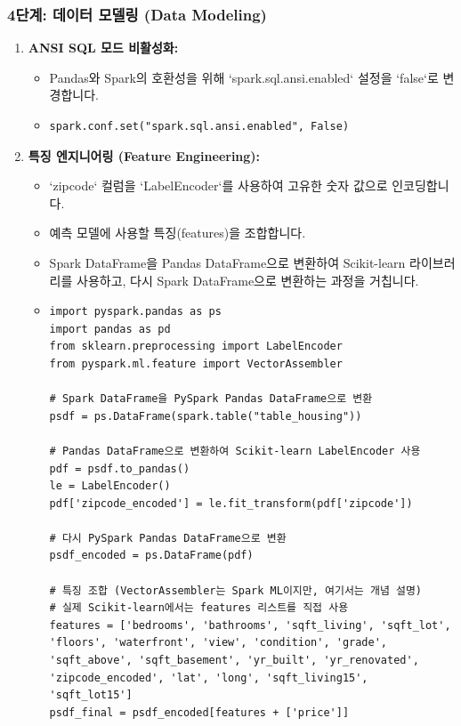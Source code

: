 \documentclass[11pt,a4paper]{article}
\begin{document}
\subsubsection{4단계: 데이터 모델링 (Data Modeling)}
\begin{enumerate}
    \item \textbf{ANSI SQL 모드 비활성화:}
    \begin{itemize}
        \item Pandas와 Spark의 호환성을 위해 `spark.sql.ansi.enabled` 설정을 `false`로 변경합니다.
        \item \lstset{language=Python}
        \begin{lstlisting}[caption=ANSI SQL 모드 설정 코드]
spark.conf.set("spark.sql.ansi.enabled", False)
        \end{lstlisting}
    \end{itemize}
    \item \textbf{특징 엔지니어링 (Feature Engineering):}
    \begin{itemize}
        \item `zipcode` 컬럼을 `LabelEncoder`를 사용하여 고유한 숫자 값으로 인코딩합니다.
        \item 예측 모델에 사용할 특징(features)을 조합합니다.
        \item Spark DataFrame을 Pandas DataFrame으로 변환하여 Scikit-learn 라이브러리를 사용하고, 다시 Spark DataFrame으로 변환하는 과정을 거칩니다.
        \item \lstset{language=Python}
        \begin{lstlisting}[caption=특징 엔지니어링 코드]
import pyspark.pandas as ps
import pandas as pd
from sklearn.preprocessing import LabelEncoder
from pyspark.ml.feature import VectorAssembler

# Spark DataFrame을 PySpark Pandas DataFrame으로 변환
psdf = ps.DataFrame(spark.table("table_housing"))

# Pandas DataFrame으로 변환하여 Scikit-learn LabelEncoder 사용
pdf = psdf.to_pandas()
le = LabelEncoder()
pdf['zipcode_encoded'] = le.fit_transform(pdf['zipcode'])

# 다시 PySpark Pandas DataFrame으로 변환
psdf_encoded = ps.DataFrame(pdf)

# 특징 조합 (VectorAssembler는 Spark ML이지만, 여기서는 개념 설명)
# 실제 Scikit-learn에서는 features 리스트를 직접 사용
features = ['bedrooms', 'bathrooms', 'sqft_living', 'sqft_lot', 'floors', 'waterfront', 'view', 'condition', 'grade', 'sqft_above', 'sqft_basement', 'yr_built', 'yr_renovated', 'zipcode_encoded', 'lat', 'long', 'sqft_living15', 'sqft_lot15']
psdf_final = psdf_encoded[features + ['price']]


\end{lstlisting}
\end{itemize}
\end{enumerate}
\end{document}
